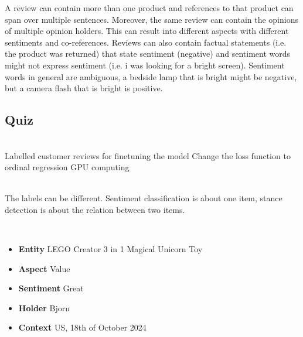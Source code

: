 A review can contain more than one product and references to that
product can span
over multiple sentences. Moreover, the same review can contain the
opinions of multiple
opinion holders. This can result into different aspects with
different sentiments and
co-references. Reviews can also contain factual statements (i.e. the
product was returned)
that state sentiment (negative) and sentiment words might not express
sentiment (i.e. i was looking for a bright screen).
Sentiment words in general are ambiguous, a bedside lamp that is
bright might be negative, but
a camera flash that is bright is positive.

\subsection{Quiz}

\begin{quiz}
  ~\\
  Labelled customer reviews for finetuning the model
  Change the loss function to ordinal regression
  GPU computing
\end{quiz}

\begin{quiz}
  ~\\
  The labels can be different.
  Sentiment classification is about one item, stance detection is
  about the relation between two items.
\end{quiz}

\begin{quiz}
  ~
  \begin{itemize}
    \item \textbf{Entity} LEGO Creator 3 in 1 Magical Unicorn Toy
    \item \textbf{Aspect} Value
    \item \textbf{Sentiment} Great
    \item \textbf{Holder} Bjorn
    \item \textbf{Context} US, 18th of October 2024
  \end{itemize}
\end{quiz}
